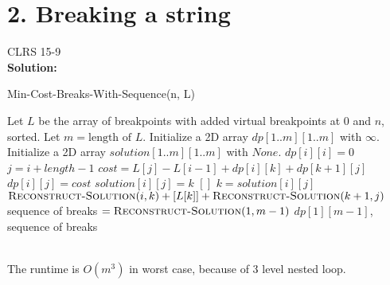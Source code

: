 \documentclass{article}
\begin{document}
\section*{2. Breaking a string} CLRS 15-9\\
\textbf{Solution:}
\begin{algorithm}
\caption{Min-Cost-Breaks-With-Sequence(n, L)}
\begin{algorithmic}[1]
\State Let $L$ be the array of breakpoints with added virtual breakpoints at 0 and $n$, sorted.
\State Let $m = \text{length of } L$.
\State Initialize a 2D array $dp[1..m][1..m]$ with $\infty$.
\State Initialize a 2D array $solution[1..m][1..m]$ with $None$.
\State $dp[i][i] = 0$
\EndFor
{}
\State $j = i + length - 1$
\State $cost = L[j] - L[i-1] + dp[i][k] + dp[k+1][j]$
\State $dp[i][j] = cost$
\State $solution[i][j] = k$
\EndIf
\EndFor
\EndFor
\EndFor
{}
\State \Return $[]$
\EndIf
\State $k = solution[i][j]$
\State \Return $\Call{Reconstruct-Solution}{i, k} + [L[k]] + \Call{Reconstruct-Solution}{k+1, j}$
\EndFunction
\State sequence of breaks $= \Call{Reconstruct-Solution}{1, m-1}$
\State \Return $dp[1][m-1]$, sequence of breaks
\end{algorithmic}
\end{algorithm}
\\ The runtime is $O(m^3)$ in worst case, because of 3 level nested loop.
\end{document}
